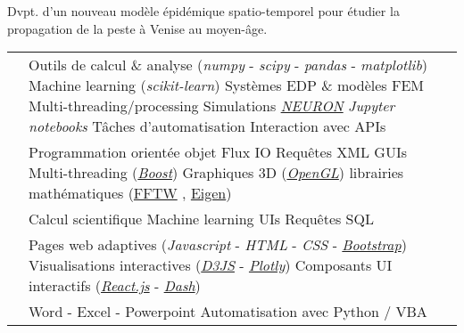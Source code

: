 \documentclass[a4paper]{cv}
\begin{document}
\begin{minipage}[t]{0.6\textwidth}
Dvpt. d'un nouveau modèle épidémique spatio-temporel pour étudier la propagation de la peste à Venise au moyen-âge. 
\sectionspace

\techskills

\def\arraystretch{1.5}
\begin{tabular}{R{0.21\textwidth} L{0.7\textwidth}}

 & Outils de calcul \& analyse (\emph{numpy} - \emph{scipy} - \emph{pandas} - \emph{matplotlib}) \tbl{} Machine learning (\emph{scikit-learn}) \tbl{} Systèmes EDP \& modèles FEM \tbl{} Multi-threading/processing \tbl{} Simulations \href{https://neuron.yale.edu/neuron/}{\emph{NEURON}} \tbl{} \emph{Jupyter notebooks} \tbl{} Tâches d'automatisation \tbl{}Interaction avec APIs\\

 & Programmation orientée objet \tbl{} Flux IO \tbl{} Requêtes XML \tbl{} GUIs \tbl{} Multi-threading (\href{https://www.boost.org/}{\emph{Boost}}) \tbl{} Graphiques 3D (\href{https://www.opengl.org/}{\emph{OpenGL}}) \tbl{} librairies mathématiques (\href{http://fftw.org/}{FFTW} , \href{http://eigen.tuxfamily.org/index.php?title=Main_Page}{Eigen})\\

 & Calcul scientifique \tbl{} Machine learning \tbl{} UIs \tbl{} Requêtes SQL\\

 & Pages web adaptives (\emph{Javascript} - \emph{HTML} - \emph{CSS} - \href{http://getbootstrap.com/}{\emph{Bootstrap}}) \tbl{} Visualisations interactives (\href{https://d3js.org}{\emph{D3JS}} - \href{https://plot.ly/}{\emph{Plotly}}) \tbl{} Composants UI interactifs (\href{https://reactjs.org}{\emph{React.js}} - \href{https://dash.plot.ly/}{\emph{Dash}}) \\

 & Word - Excel - Powerpoint \tbl{} Automatisation avec Python / VBA\\

\end{tabular}

\vspace{5pt}
\otherskills

\end{minipage}
\hsepcol
\end{document}
